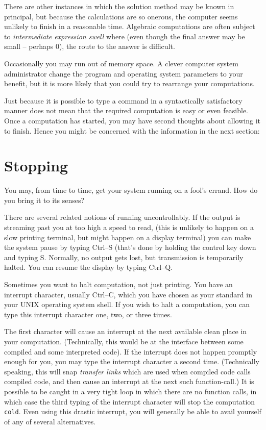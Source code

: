 There are other instances
in which the solution method may be known in principal, but because
the calculations are so onerous, the computer seems unlikely to finish
in a reasonable time.  Algebraic computations are often subject
to {\it intermediate expression swell} where (even though the final answer
may be small -- perhaps 0), the route to the answer is difficult.

Occasionally you may run out of memory space.  A clever
computer system administrator change the program
and operating system parameters to your benefit, but it is more
likely that you could
try to rearrange your computations.

Just because it is possible to type a command in a syntactically
satisfactory manner does not mean that the required computation
is easy or even feasible.  Once a computation
has started, you may have second thoughts
about allowing it to finish.  Hence you might be concerned with the
information in
the next section:

\section{Stopping}

You may, from time to time, get your system running on a fool's errand.  How do
you bring it to its senses?

There are several related notions of running uncontrollably.  If the output is streaming past you
at too high a speed to read, (this is unlikely to happen on a slow
printing terminal, but might happen on a display terminal) you
can make the system pause by typing Ctrl--S (that's done by holding
the control key down and typing S. 
Normally, no output gets lost, but transmission is temporarily
halted.  You can resume the display by typing Ctrl--Q.

Sometimes you want to halt computation, not just
printing. You have an interrupt character, usually Ctrl--C,
which you have chosen as your standard in your UNIX operating system shell.
If you wish to halt a computation,
you can type this interrupt character one, two, or three times.
\par\noindent
The first character will cause an interrupt at the next
available clean place in your
computation. (Technically, this would be
at the interface between some compiled and some interpreted code).
If the interrupt does not happen promptly
enough for you, you may type the interrupt character a second
time. (Technically speaking, this will snap
{\it transfer links} which are used when compiled code calls compiled
code, and then cause an
interrupt at the next such function-call.)
It is possible to be caught in a very tight loop in which there are
no function calls, 
in which case the third typing of the interrupt character will stop the computation
{\tt cold}.
Even using this drastic interrupt,
you will generally
be able to avail yourself of any of several alternatives.

